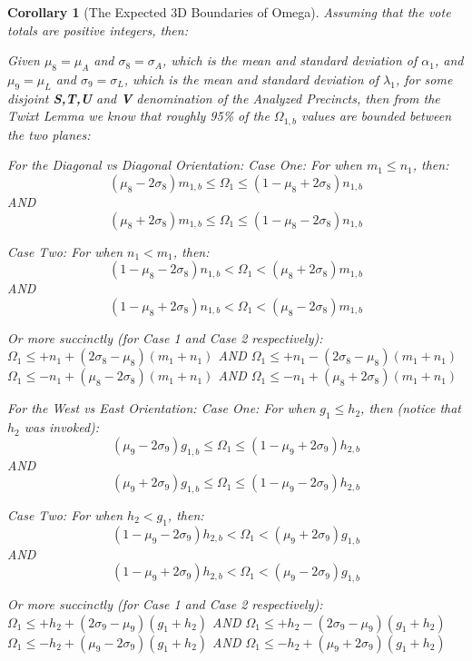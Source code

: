 \documentclass[preprint,13pt]{elsarticle}
\newtheorem{corollary}{Corollary}[theorem]
\begin{document}
\begin{corollary}[The Expected 3D Boundaries of Omega]
Assuming that the vote totals are positive integers, then:

Given $\mu_{8}=\mu_{A}$ and $\sigma_{8}=\sigma_{A}$, which is the mean and standard deviation of $\alpha_{1}$, and $\mu_{9}=\mu_{L}$ and $\sigma_{9}=\sigma_{L}$, which is the mean and standard deviation of $\lambda_{1}$, for some disjoint \textbf{S,T,U} and \textbf{V} denomination of the Analyzed Precincts, then from the Twixt Lemma we know that roughly 95\% of the $\Omega_{1,b}$ values are bounded between the two planes:

For the Diagonal vs Diagonal Orientation:
Case One:  For when $m_{1} \le n_{1}$, then:
$$(\mu_{8}-2\sigma_{8})m_{1,b} \le \Omega_{1} \le (1-\mu_{8}+2\sigma_{8})n_{1,b}$$
AND
$$(\mu_{8}+2\sigma_{8})m_{1,b} \le \Omega_{1} \le (1-\mu_{8}-2\sigma_{8})n_{1,b}$$

Case Two: For when $n_{1} < m_{1}$, then:
$$(1-\mu_{8}-2\sigma_{8})n_{1,b} < \Omega_{1} < (\mu_{8}+2\sigma_{8})m_{1,b}$$
AND
$$(1-\mu_{8}+2\sigma_{8})n_{1,b} < \Omega_{1} < (\mu_{8}-2\sigma_{8})m_{1,b}$$

Or more succinctly (for Case 1 and Case 2 respectively):\\
$\Omega_{1} \le +n_{1}+(2\sigma_{8}-\mu_{8})(m_{1}+n_{1})$ AND $\Omega_{1} \le +n_{1}-(2\sigma_{8}-\mu_{8})(m_{1}+n_{1})$\\
$\Omega_{1} \le -n_{1}+(\mu_{8}-2\sigma_{8})(m_{1}+n_{1})$ AND $\Omega_{1} \le -n_{1}+(\mu_{8}+2\sigma_{8})(m_{1}+n_{1})$

For the West vs East Orientation:
Case One:  For when $g_{1} \le h_{2}$, then (notice that $h_{2}$ was invoked):
$$(\mu_{9}-2\sigma_{9})g_{1,b} \le \Omega_{1} \le (1-\mu_{9}+2\sigma_{9})h_{2,b}$$
AND
$$(\mu_{9}+2\sigma_{9})g_{1,b} \le \Omega_{1} \le (1-\mu_{9}-2\sigma_{9})h_{2,b}$$

Case Two: For when $h_{2} < g_{1}$, then:
$$(1-\mu_{9}-2\sigma_{9})h_{2,b} < \Omega_{1} < (\mu_{9}+2\sigma_{9})g_{1,b}$$
AND
$$(1-\mu_{9}+2\sigma_{9})h_{2,b} < \Omega_{1} < (\mu_{9}-2\sigma_{9})g_{1,b}$$

Or more succinctly (for Case 1 and Case 2 respectively):\\
$\Omega_{1} \le +h_{2}+(2\sigma_{9}-\mu_{9})(g_{1}+h_{2})$ AND $\Omega_{1} \le +h_{2}-(2\sigma_{9}-\mu_{9})(g_{1}+h_{2})$\\
$\Omega_{1} \le -h_{2}+(\mu_{9}-2\sigma_{9})(g_{1}+h_{2})$ AND $\Omega_{1} \le -h_{2}+(\mu_{9}+2\sigma_{9})(g_{1}+h_{2})$
\end{corollary}
\end{document}
